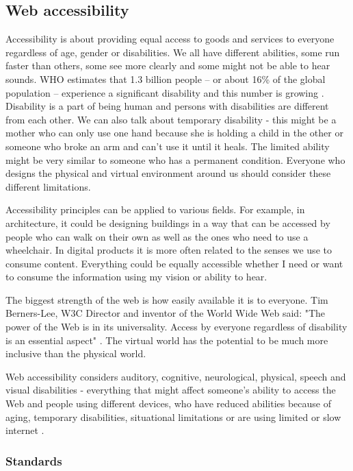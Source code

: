 \documentclass{master_thesis}
\begin{document}
\subsection{Web accessibility}

Accessibility is about providing equal access to goods and services to everyone regardless of age, gender or disabilities. We all have different abilities, some run faster than others, some see more clearly and some might not be able to hear sounds. WHO estimates that 1.3 billion people – or about 16\% of the global population – experience a significant disability and this number is growing \citep{WHO2022}. Disability is a part of being human and persons with disabilities are different from each other. We can also talk about temporary disability - this might be a mother who can only use one hand because she is holding a child in the other or someone who broke an arm and can't use it until it heals. The limited ability might be very similar to someone who has a permanent condition. Everyone who designs the physical and virtual environment around us should consider these different limitations.

Accessibility principles can be applied to various fields. For example, in architecture, it could be designing buildings in a way that can be accessed by people who can walk on their own as well as the ones who need to use a wheelchair. In digital products it is more often related to the senses we use to consume content. Everything could be equally accessible whether I need or want to consume the information using my vision or ability to hear.

The biggest strength of the web is how easily available it is to everyone. Tim Berners-Lee, W3C Director and inventor of the World Wide Web said: "The power of the Web is in its universality. Access by everyone regardless of disability is an essential aspect" \citep{WWWC1997}. The virtual world has the potential to be much more inclusive than the physical world.

Web accessibility considers auditory, cognitive, neurological, physical, speech and visual disabilities - everything that might affect someone's ability to access the Web and people using different devices, who have reduced abilities because of aging, temporary disabilities, situational limitations or are using limited or slow internet \citep{Henry2022}.

\subsubsection{Standards}
\end{document}
